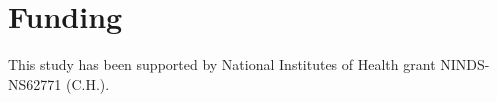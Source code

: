 \section{Funding}

This study has been supported by National Institutes of Health grant NINDS-NS62771 (C.H.).
